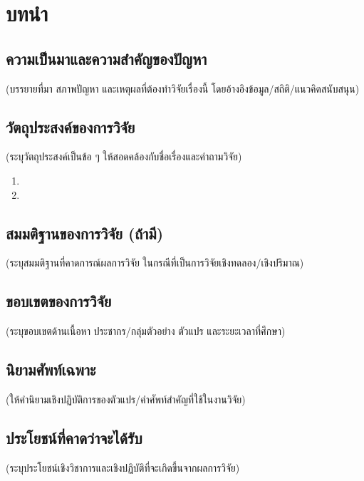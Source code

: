 \chapter{บทนำ}

\section{ความเป็นมาและความสำคัญของปัญหา}
(บรรยายที่มา สภาพปัญหา และเหตุผลที่ต้องทำวิจัยเรื่องนี้ โดยอ้างอิงข้อมูล/สถิติ/แนวคิดสนับสนุน)

\section{วัตถุประสงค์ของการวิจัย}
(ระบุวัตถุประสงค์เป็นข้อ ๆ ให้สอดคล้องกับชื่อเรื่องและคำถามวิจัย)
\begin{enumerate}
  \item [วัตถุประสงค์ข้อที่ 1]
  \item [วัตถุประสงค์ข้อที่ 2]
\end{enumerate}

\section{สมมติฐานของการวิจัย (ถ้ามี)}
(ระบุสมมติฐานที่คาดการณ์ผลการวิจัย ในกรณีที่เป็นการวิจัยเชิงทดลอง/เชิงปริมาณ)

\section{ขอบเขตของการวิจัย}
(ระบุขอบเขตด้านเนื้อหา ประชากร/กลุ่มตัวอย่าง ตัวแปร และระยะเวลาที่ศึกษา)

\section{นิยามศัพท์เฉพาะ}
(ให้คำนิยามเชิงปฏิบัติการของตัวแปร/คำศัพท์สำคัญที่ใช้ในงานวิจัย)

\section{ประโยชน์ที่คาดว่าจะได้รับ}
(ระบุประโยชน์เชิงวิชาการและเชิงปฏิบัติที่จะเกิดขึ้นจากผลการวิจัย)
